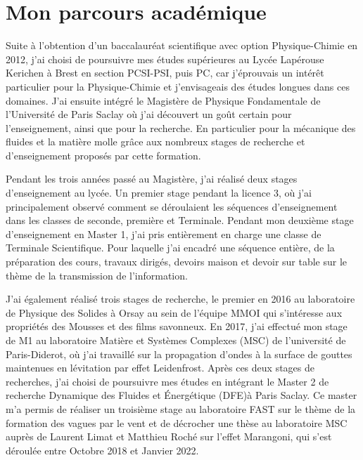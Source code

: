 \documentclass[french, 10pt]{article}
\begin{document}
\section{Mon parcours académique}

Suite à l'obtention d'un baccalauréat scientifique avec option Physique-Chimie en 2012, j'ai choisi de poursuivre mes études supérieures au Lycée Lapérouse Kerichen à Brest en section PCSI-PSI, puis PC, car j'éprouvais un intérêt particulier pour la Physique-Chimie et j'envisageais des études longues dans ces domaines. J'ai ensuite intégré le Magistère de Physique Fondamentale de l'Université de Paris Saclay où j'ai découvert un goût certain pour l'enseignement, ainsi que pour la recherche. En particulier pour la mécanique des fluides et la matière molle grâce aux nombreux stages de recherche et d'enseignement proposés par cette formation.\medskip

Pendant les trois années passé au Magistère, j'ai réalisé deux stages d'enseignement au lycée. Un premier stage pendant la licence 3, où j'ai principalement observé comment se déroulaient les séquences d'enseignement dans les classes de seconde, première et Terminale. Pendant mon deuxième stage d'enseignement en Master 1, j'ai pris entièrement en charge une classe de Terminale Scientifique. Pour laquelle j'ai encadré une séquence entière, de la préparation des cours, travaux dirigés, devoirs maison et devoir sur table sur le thème de la transmission de l'information. \medskip

J'ai également réalisé trois stages de recherche, le premier en 2016 au laboratoire de Physique des Solides à Orsay au sein de l'équipe MMOI qui s'intéresse aux propriétés des Mousses et des films savonneux. En 2017, j'ai effectué mon stage de M1 au laboratoire Matière et Systèmes Complexes (MSC) de l'université de Paris-Diderot, où j'ai travaillé sur la propagation d'ondes à la surface de gouttes maintenues en lévitation par effet Leidenfrost. Après ces deux stages de recherches, j'ai choisi de poursuivre mes études en intégrant le Master 2 de recherche Dynamique des Fluides et Énergétique (DFE)à Paris Saclay. Ce master m'a permis de réaliser un troisième stage au laboratoire FAST sur le thème de la formation des vagues par le vent et de décrocher une thèse au laboratoire MSC auprès de Laurent Limat et Matthieu Roché sur l'effet Marangoni, qui s'est déroulée entre Octobre 2018 et Janvier 2022.\medskip 
\end{document}
